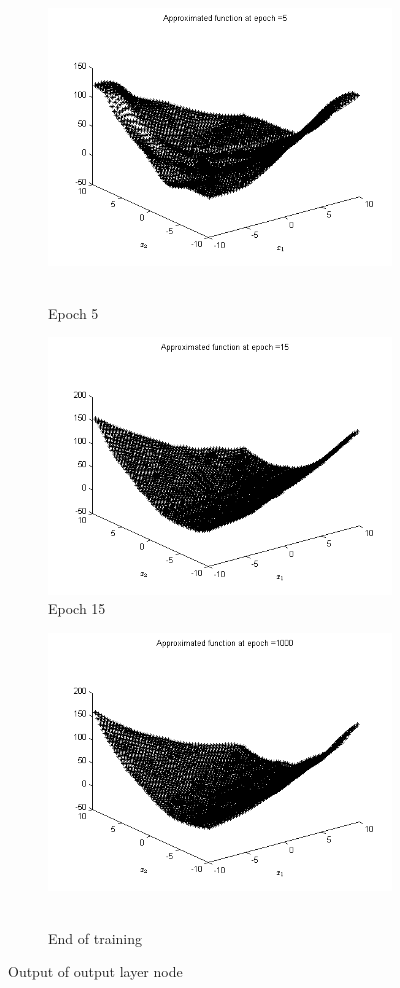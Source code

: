 \documentclass{article}
\begin{document}
\begin{figure}
  \begin{subfigure}{.5\textwidth}
  \centering
  \includegraphics[width=.8\linewidth]{Regression/bivariate/2layers_epoch_5.png}\
  \caption{Epoch 5}
\end{subfigure}%
\begin{subfigure}{.5\textwidth}
  \centering
  \includegraphics[width=.8\linewidth]{Regression/bivariate/2layers_epoch_15.png}
   \caption{Epoch 15}
  \end{subfigure}
  
  \begin{subfigure}{.5\textwidth}
  \centering
  \includegraphics[width=.8\linewidth]{Regression/bivariate/2layers_epoch_1000.png}\
  \caption{End of training}
\end{subfigure}%
  
\caption{Output of output layer node}
\end{figure}
\end{document}
